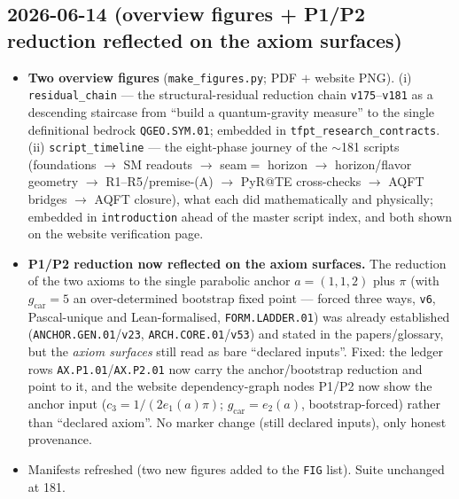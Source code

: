 \documentclass[11pt]{article}
\providecommand{\vref}[1]{\texttt{#1}}
\begin{document}
\subsection*{2026-06-14 (overview figures + P1/P2 reduction reflected on the axiom surfaces)}
\begin{itemize}
\item \textbf{Two overview figures} (\texttt{make\_figures.py}; PDF $+$ website PNG). (i)
  \texttt{residual\_chain} --- the structural-residual reduction chain \vref{v175}--\vref{v181} as a
  descending staircase from ``build a quantum-gravity measure'' to the single definitional bedrock
  \texttt{QGEO.SYM.01}; embedded in \texttt{tfpt\_research\_contracts}. (ii) \texttt{script\_timeline}
  --- the eight-phase journey of the $\sim$181 scripts (foundations $\to$ SM readouts $\to$ seam$=$
  horizon $\to$ horizon/flavor geometry $\to$ R1--R5/premise-(A) $\to$ PyR@TE cross-checks $\to$ AQFT
  bridges $\to$ AQFT closure), what each did mathematically and physically; embedded in
  \texttt{introduction} ahead of the master script index, and both shown on the website verification page.
\item \textbf{P1/P2 reduction now reflected on the axiom surfaces.} The reduction of the two axioms to
  the single parabolic anchor $a=(1,1,2)$ plus $\pi$ (with $g_{\mathrm{car}}=5$ an over-determined
  bootstrap fixed point --- forced three ways, \vref{v6}, Pascal-unique and Lean-formalised,
  \texttt{FORM.LADDER.01}) was already established (\texttt{ANCHOR.GEN.01}/\vref{v23},
  \texttt{ARCH.CORE.01}/\vref{v53}) and stated in the papers/glossary, but the \emph{axiom surfaces}
  still read as bare ``declared inputs''. Fixed: the ledger rows \texttt{AX.P1.01}/\texttt{AX.P2.01} now
  carry the anchor/bootstrap reduction and point to it, and the website dependency-graph nodes P1/P2 now
  show the anchor input ($c_3=1/(2e_1(a)\pi)$; $g_{\mathrm{car}}=e_2(a)$, bootstrap-forced) rather than
  ``declared axiom''. No marker change (still declared inputs), only honest provenance.
\item Manifests refreshed (two new figures added to the \texttt{FIG} list). Suite unchanged at 181.
\end{itemize}
\end{document}
